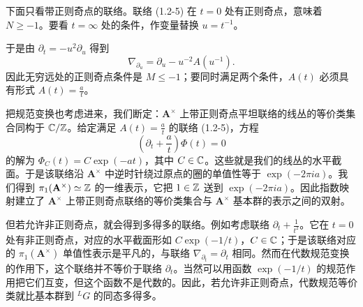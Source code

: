 下面只看带正则奇点的联络。联络 (1.2-5) 在 $t=0$ 处有正则奇点，意味着 $N\ge -1$。要看 $t=\infty$ 处的条件，作变量替换 $u=t^{-1}$。

于是由 $\partial_t=-u^2\partial_u$ 得到
\[
    \nabla_{\partial_u}=\partial_u-u^{-2}A(u^{-1}).
\]
因此无穷远处的正则奇点条件是 $M\le -1$；要同时满足两个条件，$A(t)$ 必须具有形式 $A(t)=\frac{a}{t}$。

把规范变换也考虑进来，我们断定：$\mathbf{A}^\times$ 上带正则奇点平坦联络的线丛的等价类集合同构于 $\mathbb{C}/\mathbb{Z}$。给定满足 $A(t)=\frac{a}{t}$ 的联络 (1.2-5)，方程
\[
    \left(\partial_t+\frac{a}{t}\right)\Phi(t)=0
\]
的解为 $\Phi_C(t)=C\exp(-at)$，其中 $C\in\mathbb{C}$。这些就是我们的线丛的水平截面。于是该联络沿 $\mathbf{A}^\times$ 中逆时针绕过原点的圈的单值性等于 $\exp(-2\pi ia)$。我们得到 $\pi_1(\mathbf{A}^\times)\simeq\mathbb{Z}$ 的一维表示，它把 $1\in\mathbb{Z}$ 送到 $\exp(-2\pi ia)$。因此指数映射建立了 $\mathbf{A}^\times$ 上带正则奇点联络的等价类集合与 $\mathbf{A}^\times$ 基本群的表示之间的双射。

但若允许非正则奇点，就会得到多得多的联络。例如考虑联络 $\partial_t+\frac{1}{t^2}$。它在 $t=0$ 处有非正则奇点，对应的水平截面形如 $C\exp(-1/t)$，$C\in\mathbb{C}$；于是该联络对应的 $\pi_1(\mathbf{A}^\times)$ 单值性表示是平凡的，与联络 $\nabla_{\partial_t}=\partial_t$ 相同。然而在代数规范变换的作用下，这个联络并不等价于联络 $\partial_t$。当然可以用函数 $\exp(-1/t)$ 的规范作用把它们互变，但这个函数不是代数的。因此，若允许非正则奇点，代数规范等价类就比基本群到 ${}^L G$ 的同态多得多。

